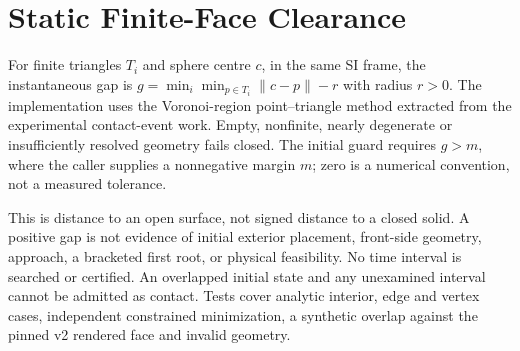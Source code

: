 \documentclass{article}
\begin{document}
\section{Static Finite-Face Clearance}
For finite triangles $T_i$ and sphere centre $c$, in the same SI frame, the
instantaneous gap is $g=\min_i\min_{p\in T_i}\lVert c-p\rVert-r$ with radius
$r>0$. The implementation uses the Voronoi-region point--triangle method
extracted from the experimental contact-event work. Empty, nonfinite, nearly
degenerate or insufficiently resolved geometry fails closed. The initial guard
requires $g>m$, where the caller supplies a nonnegative margin $m$; zero is a
numerical convention, not a measured tolerance.

This is distance to an open surface, not signed distance to a closed solid.
A positive gap is not evidence of initial exterior placement, front-side
geometry, approach, a bracketed first root, or physical feasibility. No time
interval is searched or certified. An overlapped initial state and any
unexamined interval cannot be admitted as contact. Tests cover analytic
interior, edge and vertex cases, independent constrained minimization, a
synthetic overlap against the pinned v2 rendered face and invalid geometry.
\end{document}
